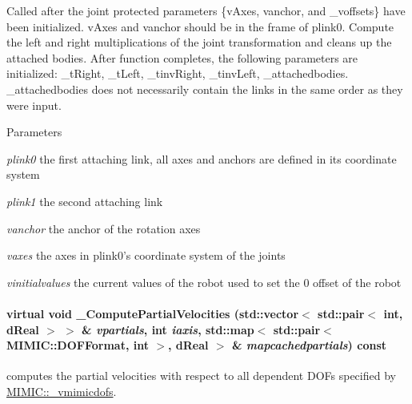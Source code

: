 Called after the joint protected parameters \{vAxes, vanchor, and \_\-voffsets\} have been initialized. vAxes and vanchor should be in the frame of plink0. Compute the left and right multiplications of the joint transformation and cleans up the attached bodies. After function completes, the following parameters are initialized: \_\-tRight, \_\-tLeft, \_\-tinvRight, \_\-tinvLeft, \_\-attachedbodies. \_\-attachedbodies does not necessarily contain the links in the same order as they were input. 
\begin{DoxyParams}{Parameters}
\item[{\em plink0}]the first attaching link, all axes and anchors are defined in its coordinate system \item[{\em plink1}]the second attaching link \item[{\em vanchor}]the anchor of the rotation axes \item[{\em vaxes}]the axes in plink0's coordinate system of the joints \item[{\em vinitialvalues}]the current values of the robot used to set the 0 offset of the robot \end{DoxyParams}
\hypertarget{classOpenRAVE_1_1KinBody_1_1Joint_aa78a272e319f192cece4bb8662a64cc2}{
\paragraph[{\_\-ComputePartialVelocities}]{\setlength{\rightskip}{0pt plus 5cm}virtual void \_\-ComputePartialVelocities (std::vector$<$ std::pair$<$ int, dReal $>$ $>$ \& {\em vpartials}, \/  int {\em iaxis}, \/  std::map$<$ std::pair$<$ MIMIC::DOFFormat, int $>$, dReal $>$ \& {\em mapcachedpartials}) const}\hfill}
\label{classOpenRAVE_1_1KinBody_1_1Joint_aa78a272e319f192cece4bb8662a64cc2}


computes the partial velocities with respect to all dependent DOFs specified by \hyperlink{structOpenRAVE_1_1KinBody_1_1Joint_1_1MIMIC_a88385fe7c2cecd8d6e625252f60a8f1f}{MIMIC::\_\-vmimicdofs}. 

